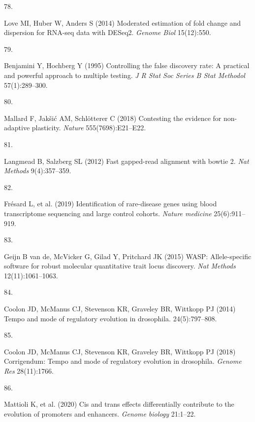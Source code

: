 \documentclass[9pt,twocolumn,twoside,lineno]{pnas-new}
\newlength{\cslhangindent}
\newlength{\csllabelwidth}
\newlength{\cslentryspacingunit} %
\newenvironment{CSLReferences}[2] %
 {%
  \setlength{\parindent}{0pt}
  \ifodd #1
  \let\oldpar\par
  \def\par{\hangindent=\cslhangindent\oldpar}
  \fi
  \setlength{\parskip}{#2\cslentryspacingunit}
 }%
 {}
\newcommand{\CSLLeftMargin}[1]{\parbox[t]{\csllabelwidth}{#1}}
\newcommand{\CSLRightInline}[1]{\parbox[t]{\linewidth - \csllabelwidth}{#1}\break}
\begin{document}
\begin{CSLReferences}{0}{0}
\leavevmode{}%
\CSLLeftMargin{78. }%
\CSLRightInline{Love MI, Huber W, Anders S (2014) Moderated estimation
of fold change and dispersion for {RNA-seq} data with {DESeq2}.
\emph{Genome Biol} 15(12):550.}

\leavevmode{}%
\CSLLeftMargin{79. }%
\CSLRightInline{Benjamini Y, Hochberg Y (1995) Controlling the false
discovery rate: A practical and powerful approach to multiple testing.
\emph{J R Stat Soc Series B Stat Methodol} 57(1):289--300.}

\leavevmode{}%
\CSLLeftMargin{80. }%
\CSLRightInline{Mallard F, Jakšić AM, Schlötterer C (2018) Contesting
the evidence for non-adaptive plasticity. \emph{Nature}
555(7698):E21--E22.}

\leavevmode{}%
\CSLLeftMargin{81. }%
\CSLRightInline{Langmead B, Salzberg SL (2012) Fast gapped-read
alignment with bowtie 2. \emph{Nat Methods} 9(4):357--359.}

\leavevmode{}%
\CSLLeftMargin{82. }%
\CSLRightInline{Frésard L, et al. (2019) Identification of rare-disease
genes using blood transcriptome sequencing and large control cohorts.
\emph{Nature medicine} 25(6):911--919.}

\leavevmode{}%
\CSLLeftMargin{83. }%
\CSLRightInline{Geijn B van de, McVicker G, Gilad Y, Pritchard JK (2015)
{WASP}: Allele-specific software for robust molecular quantitative trait
locus discovery. \emph{Nat Methods} 12(11):1061--1063.}

\leavevmode{}%
\CSLLeftMargin{84. }%
\CSLRightInline{Coolon JD, McManus CJ, Stevenson KR, Graveley BR,
Wittkopp PJ (2014) Tempo and mode of regulatory evolution in drosophila.
24(5):797--808.}

\leavevmode{}%
\CSLLeftMargin{85. }%
\CSLRightInline{Coolon JD, McManus CJ, Stevenson KR, Graveley BR,
Wittkopp PJ (2018) Corrigendum: Tempo and mode of regulatory evolution
in drosophila. \emph{Genome Res} 28(11):1766.}

\leavevmode{}%
\CSLLeftMargin{86. }%
\CSLRightInline{Mattioli K, et al. (2020) Cis and trans effects
differentially contribute to the evolution of promoters and enhancers.
\emph{Genome biology} 21:1--22.}


\end{CSLReferences}
\end{document}

